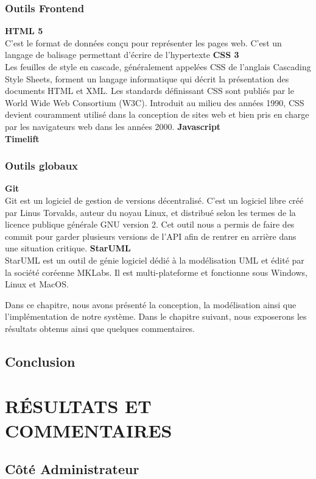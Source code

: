 \documentclass[11pt,a4paper]{report}
\begin{document}
\subsection{Outils Frontend} 

   \textbf{HTML 5} \\ 
   C'est le format de données conçu pour représenter les pages web. C'est un langage de
balisage permettant d'écrire de l'hypertexte
 \textbf{CSS 3} \\ 
   Les feuilles de style en cascade, généralement appelées CSS de l'anglais Cascading Style
Sheets, forment un langage informatique qui décrit la présentation des documents HTML
et XML. Les standards définissant CSS sont publiés par le World Wide Web Consortium
(W3C). Introduit au milieu des années 1990, CSS devient couramment utilisé dans la
conception de sites web et bien pris en charge par les navigateurs web dans les années
2000.
   \textbf{Javascript}\\  
   \textbf{Timelift} \\ 
\subsection{Outils globaux} 
   \textbf{Git} \\ 
Git est un logiciel de gestion de versions décentralisé. C'est un logiciel libre créé par
Linus Torvalds, auteur du noyau Linux, et distribué selon les termes de la licence publique
générale GNU version 2. Cet outil nous a permis de faire des commit pour garder plusieurs
versions de l'API afin de rentrer en arrière dans une situation critique.
   \textbf{StarUML}\\ 
StarUML est un outil de génie logiciel dédié à la modélisation UML et édité par la société
coréenne MKLabs. Il est multi-plateforme et fonctionne sous Windows, Linux et MacOS.

Dans ce chapitre, nous avons présenté la conception, la modélisation ainsi que l'implémentation de notre système. Dans le chapitre suivant, nous exposerons les résultats obtenus
ainsi que quelques commentaires.
\section{Conclusion} 
\chapter{RÉSULTATS ET COMMENTAIRES}

\section{Côté Administrateur} 
\end{document}
